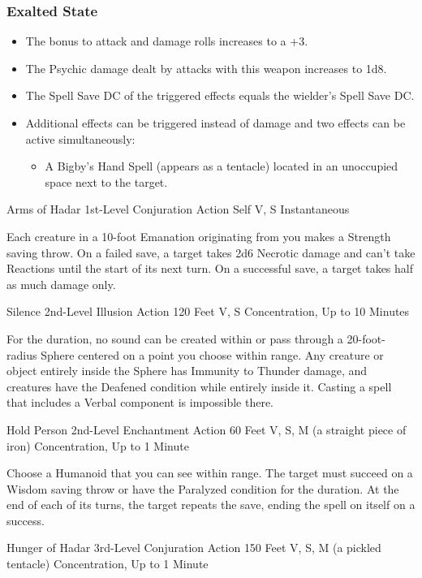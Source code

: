 {\subsubsection*{Exalted State}
\begin{itemize}
	\item The bonus to attack and damage rolls increases to a +3.
	\item The Psychic damage dealt by attacks with this weapon increases to 1d8.
	\item The Spell Save DC of the triggered effects equals the wielder's Spell Save DC.
	\item Additional effects can be triggered instead of damage and two effects can be active simultaneously:
	\begin{itemize}
		\item A Bigby's Hand Spell (appears as a tentacle) located in an unoccupied space next to the target.
	\end{itemize}
\end{itemize}}
\vfill\eject
\DndSpellHeader
  {Arms of Hadar}
  {1st-Level Conjuration}
  {Action}
  {Self}
  {V, S}
  {Instantaneous}

\noindent Each creature in a 10-foot Emanation originating from you makes a Strength saving throw. On a failed save, a target takes 2d6 Necrotic damage and can't take Reactions until the start of its next turn. On a successful save, a target takes half as much damage only.

\DndSpellHeader
  {Silence}
  {2nd-Level Illusion}
  {Action}
  {120 Feet}
  {V, S}
  {Concentration, Up to 10 Minutes}

\noindent For the duration, no sound can be created within or pass through a 20-foot-radius Sphere centered on a point you choose within range. Any creature or object entirely inside the Sphere has Immunity to Thunder damage, and creatures have the Deafened condition while entirely inside it. Casting a spell that includes a Verbal component is impossible there.

\DndSpellHeader
  {Hold Person}
  {2nd-Level Enchantment}
  {Action}
  {60 Feet}
  {V, S, M (a straight piece of iron)}
  {Concentration, Up to 1 Minute}

\noindent Choose a Humanoid that you can see within range. The target must succeed on a Wisdom saving throw or have the Paralyzed condition for the duration. At the end of each of its turns, the target repeats the save, ending the spell on itself on a success.

\DndSpellHeader
  {Hunger of Hadar}
  {3rd-Level Conjuration}
  {Action}
  {150 Feet}
  {V, S, M (a pickled tentacle)}
  {Concentration, Up to 1 Minute}

